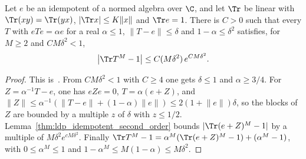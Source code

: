 \begin{lemma}
    \label{thm:ldp_idempotent_compressed_second_order}
    \leanok
    Let $e$ be an idempotent of a normed algebra over $\C$, and let $\Tr$ be linear with
    $\Tr(xy)=\Tr(yx)$, $\lvert\Tr x\rvert\le K\lVert x\rVert$ and $\Tr e=1$. There is $C>0$
    such that every $T$ with $eTe=\alpha e$ for a real $\alpha\le1$,
    $\lVert T-e\rVert\le\delta$ and $1-\alpha\le\delta^2$ satisfies, for $M\ge2$ and
    $CM\delta^2<1$,
    \begin{align*}
        \bigl\lvert\Tr T^M-1\bigr\rvert\le C(M\delta^2)\,e^{CM\delta^2}.
    \end{align*}
\end{lemma}
\begin{proof}
    \leanok
    This is~\cite[``Powers of an element compressed by an
        idempotent'']{QICLean2026Blueprint}.
    From $CM\delta^2<1$ with $C\ge4$ one gets $\delta\le1$ and $\alpha\ge3/4$. For
    $Z=\alpha^{-1}T-e$, one has $eZe=0$, $T=\alpha(e+Z)$, and
    $\lVert Z\rVert\le\alpha^{-1}(\lVert T-e\rVert+(1-\alpha)\lVert e\rVert)
        \le2(1+\lVert e\rVert)\delta$, so the blocks of $Z$ are bounded by a multiple $z$ of
    $\delta$ with $z\le1/2$. Lemma~\ref{thm:ldp_idempotent_second_order} bounds
    $\lvert\Tr(e+Z)^M-1\rvert$ by a multiple of $M\delta^2e^{cM\delta^2}$. Finally
    $\Tr T^M-1=\alpha^M(\Tr(e+Z)^M-1)+(\alpha^M-1)$, with $0\le\alpha^M\le1$ and
    $1-\alpha^M\le M(1-\alpha)\le M\delta^2$.
\end{proof}

